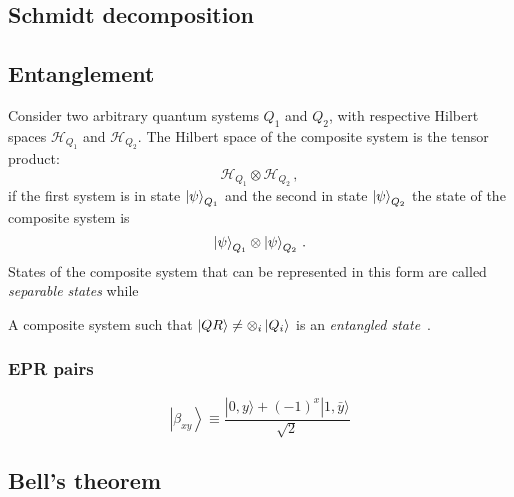 \subsection{Schmidt decomposition}

\subsection{Entanglement}
Consider two arbitrary quantum systems $Q_1$ and $Q_2$, with respective Hilbert spaces $\mathcal{H}_{Q_1}$ and $\mathcal{H}_{Q_2}.$ The Hilbert space of the composite system is the tensor product: 
\begin{equation*}
\mathcal{H}_{Q_1} \otimes \mathcal{H}_{Q_2}\,,
\end{equation*}
if the first system is in state $\ket{\psi}_{Q_1}$ and the second in state $\ket{\psi}_{Q_2}$ the state of the composite system is
\begin{equation}
    \ket{\psi}_{Q_1} \otimes \ket{\psi}_{Q_2}\,.
\end{equation}
States of the composite system that can be represented in this form are called \emph{separable states} while
\begin{defn}
A composite system such that $\ket{QR} \neq \otimes_i \ket{Q_i}$ is an \emph{entangled state}~\cite{verrucchi}.
\end{defn}

\subsubsection{EPR pairs}

\begin{equation}
    \left|\beta_{x y}\right\rangle \equiv \frac{|0, y\rangle+(-1)^{x}|1, \bar{y}\rangle}{\sqrt{2}}
\end{equation}
\subsection{Bell's theorem}
